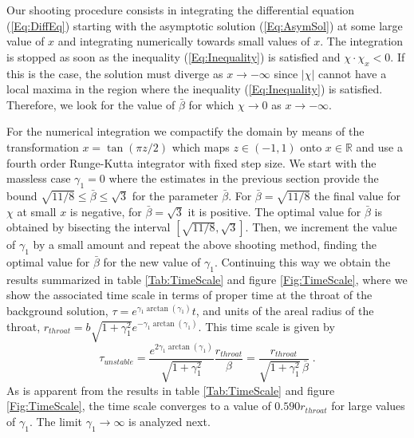 \documentclass[           %
               showpacs,            %
               preprintnumbers,     %
               aps,                 %
               prd,                 %
               superscriptaddress,      %
               nofootinbib,         %
               tightenlines,        %
               floats,floatfix      %
               ]{revtex4}
\newcommand{\Real}{\mathbb{R}}
\begin{document}
Our shooting procedure consists in integrating the differential
equation (\ref{Eq:DiffEq}) starting with the asymptotic solution
(\ref{Eq:AsymSol}) at some large value of $x$ and integrating
numerically towards small values of $x$. The integration is stopped as
soon as the inequality (\ref{Eq:Inequality}) is satisfied and
$\chi\cdot\chi_x < 0$. If this is the case, the solution must diverge
as $x\to -\infty$ since $|\chi|$ cannot have a local maxima in the
region where the inequality (\ref{Eq:Inequality}) is
satisfied. Therefore, we look for the value of $\bar{\beta}$ for which
$\chi\to 0$ as $x\to -\infty$.

For the numerical integration we compactify the domain by means of the
transformation $x = \tan(\pi z/2)$ which maps $z\in (-1,1)$ onto
$x\in\Real$ and use a fourth order Runge-Kutta integrator with fixed
step size. We start with the massless case $\gamma_1 = 0$ where the
estimates in the previous section provide the bound $\sqrt{11/8} \leq
\bar{\beta} \leq \sqrt{3}$ for the parameter $\bar{\beta}$. For
$\bar{\beta} = \sqrt{11/8}$ the final value for $\chi$ at small $x$ is
negative, for $\bar{\beta} = \sqrt{3}$ it is positive. The optimal
value for $\bar{\beta}$ is obtained by bisecting the interval
$[\sqrt{11/8},\sqrt{3}]$. Then, we increment the value of $\gamma_1$
by a small amount and repeat the above shooting method, finding the
optimal value for $\bar{\beta}$ for the new value of
$\gamma_1$. Continuing this way we obtain the results summarized in
table \ref{Tab:TimeScale} and figure \ref{Fig:TimeScale}, where we
show the associated time scale in terms of proper time at the throat
of the background solution, $\tau = e^{\gamma_1\arctan(\gamma_1)} t$,
and units of the areal radius of the throat, $r_{throat} =
b\sqrt{1+\gamma_1^2} e^{-\gamma_1\arctan(\gamma_1)}$. This time scale
is given by
\begin{displaymath}
\tau_{unstable} = \frac{e^{2\gamma_1\arctan(\gamma_1)}}{\sqrt{1+\gamma_1^2}}
\frac{r_{throat}}{\beta} 
 = \frac{r_{throat}}{\sqrt{1+\gamma_1^2}\,\bar{\beta}}\; .
\end{displaymath}
As is apparent from the results in table \ref{Tab:TimeScale} and
figure \ref{Fig:TimeScale}, the time scale converges to a value of
$0.590 r_{throat}$ for large values of $\gamma_1$. The limit
$\gamma_1\to\infty$ is analyzed next.
\end{document}
